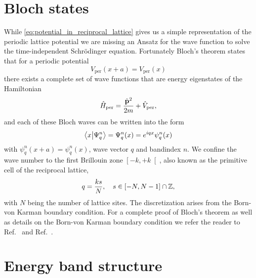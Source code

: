 \section{Bloch states}

While \cref{eq:potential_in_reciprocal_lattice} gives us a simple representation
of the periodic lattice potential we are missing an Ansatz for the wave
function to solve the time-independent Schrödinger equation. Fortunately
Bloch's theorem states that for a periodic potential
\begin{equation}
  V_\text{per}(x+a)=V_\text{per}(x)
  \label{eq:potential_periodic}
\end{equation}
there exists a complete set of wave functions that are energy eigenstates
of the Hamiltonian
\begin{equation}
  \hat{H}_\text{per}
  =\frac{\hat{\vb{p}}^2}{2m}+\hat{V}_\text{per}
  \label{eq:hamiltonian_periodic},
\end{equation}
and each of these Bloch waves can be written into the form
\begin{equation}
  \bra{x}\ket{\Psi^n_q}
  =\Psi^n_q(x)
  =e^{iqx}\psi^n_q(x)
  \label{eq:state_bloch}
\end{equation}
with $\psi^n_q(x+a)=\psi^n_q(x)$, wave vector $q$ and bandindex $n$. We
confine the wave number to the first Brillouin zone $\left[-k,+k\right[$,
also known as the primitive cell of the reciprocal lattice,
\begin{equation}
  q=\frac{ks}{N}
  \qc s\in\left[-N,N-1\right]\cap\mathbb{Z},
  \label{eq:wavenumber_quasi}
\end{equation}
with $N$ being the number of lattice sites. The discretization arises from
the Born-von Karman boundary condition. For a complete proof of Bloch's
theorem as well as details on the Born-von Karman boundary condition we refer
the reader to Ref.~\cite{Roessler2004} and Ref.~\cite{Bartelmann2018}.

\section{Energy band structure}

